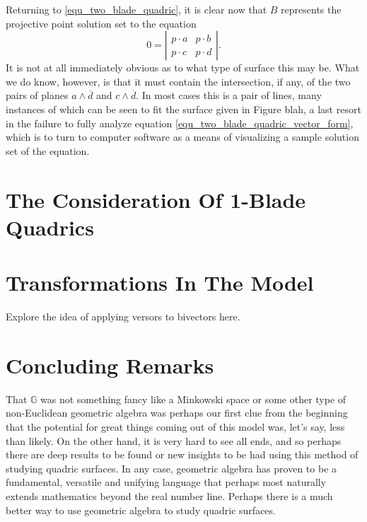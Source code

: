\documentclass{ecgd-l}
\newcommand{\G}{\mathbb{G}}
\theoremstyle{definition}
\theoremstyle{remark}
\numberwithin{equation}{section}
\begin{document}
Returning to \eqref{equ_two_blade_quadric}, it is clear now that $B$ represents
the projective point solution set to the equation
\begin{equation}\label{equ_two_blade_quadric_vector_form}
0 = \left|\begin{array}{cc} p\cdot a & p\cdot b \\ p\cdot c & p\cdot d \end{array}\right|.
\end{equation}
It is not at all immediately obvious as to what type of surface this may be.  What we do know, however, is that it must
contain the intersection, if any, of the two pairs of planes $a\wedge\overline{d}$ and $c\wedge\overline{d}$.
In most cases this is a pair of lines, many instances of which can be seen to fit the surface
given in Figure blah, a last resort in the failure to fully analyze equation \eqref{equ_two_blade_quadric_vector_form},
which is to turn to computer software as a means of visualizing a sample solution set of the equation.



\section{The Consideration Of 1-Blade Quadrics}

\section{Transformations In The Model}

Explore the idea of applying versors to bivectors here.


\section{Concluding Remarks}

That $\G$ was not something fancy like a Minkowski space or some other
type of non-Euclidean geometric algebra was perhaps our first clue from
the beginning that the potential for great things coming out of this model
was, let's say, less than likely.  On the other hand, it is very hard to see
all ends, and so perhaps there are deep results to be found or new insights
to be had using this method of studying quadric surfaces.  In any case,
geometric algebra has proven to be a fundamental, versatile and unifying
language that perhaps most naturally extends mathematics beyond the real number line.  Perhaps
there is a much better way to use geometric algebra to study quadric surfaces.
\end{document}
